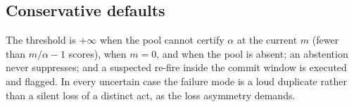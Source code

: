 \subsection{Conservative defaults}\label{sec:defaults}

The threshold is $+\infty$ when the pool cannot certify $\alpha$ at the current $m$ (fewer than $m/\alpha-1$ scores), when $m=0$, and when the pool is absent; an abstention never suppresses; and a suspected re-fire inside the commit window is executed and flagged. In every uncertain case the failure mode is a loud duplicate rather than a silent loss of a distinct act, as the loss asymmetry demands.
